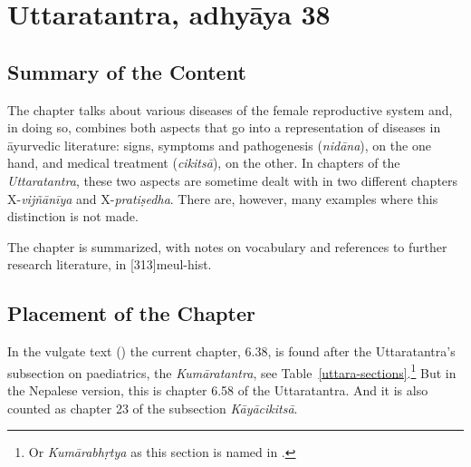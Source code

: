 
\section{Uttaratantra, adhyāya 38}

\subsection{Summary of the Content} 

The chapter talks about various diseases of the female reproductive
system and, in doing so, combines both aspects that go into a
representation of diseases in āyurvedic literature: signs, symptoms and
pathogenesis (\emph{nidāna}), on the one hand, and medical treatment
(\emph{cikitsā}), on the other. In chapters of the \emph{Uttaratantra},
these two aspects are sometime dealt with in two different chapters
X-\emph{vijñānīya} and X-\emph{pratiṣedha}. There are, however, many
examples where this distinction is not made.

The chapter is summarized, with notes on vocabulary and references to
further research literature, in [313]{meul-hist}.

\subsection{Placement of the Chapter}

In the vulgate text (\cite{vulgate}) the current chapter, 6.38, is found
after the Uttaratantra's subsection on paediatrics, the
\emph{Kumāratantra}, see Table~\ref{uttara-sections}.\footnote{Or 
\emph{Kumārabhṛtya} as this section is
    named in .}  But in the Nepalese version, this
    is chapter 6.58 of the Uttaratantra. And it is also counted as chapter 23
    of the subsection \emph{Kāyācikitsā}.

